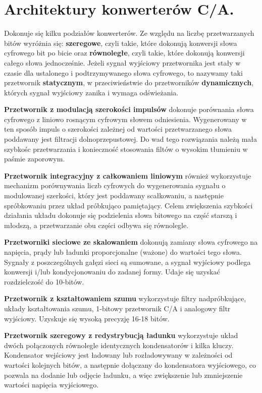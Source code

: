 \documentclass[10pt,a4paper]{report}
\begin{document}
	\section{Architektury konwerterów C/A. \cite{cmosanal} \cite{plassche}}
	{	Dokonuje się kilku podziałów konwerterów. Ze względu na liczbę przetwarzanych bitów wyróżnia się: \textbf{szeregowe}, czyli takie, które dokonują konwersji słowa cyfrowego bit po bicie oraz \textbf{równoległe}, czyli takie, które dokonują konwersji całego słowa jednocześnie. Jeżeli sygnał wyjściowy przetwornika jest stały w czasie dla ustalonego i podtrzymywanego słowa cyfrowego, to nazywamy taki przetwornik \textbf{statycznym}, w przeciwieństwie do przetworników \textbf{dynamicznych}, których sygnał wyjściowy zanika i wymaga odświeżania. }
	
	{	\textbf{Przetwornik z modulacją szerokości impulsów} dokonuje porównania słowa cyfrowego z liniowo rosnącym cyfrowym słowem odniesienia. Wygenerowany w ten sposób impuls o szerokości zależnej od wartości przetwarzanego słowa poddawany jest filtracji dolnoprzepustowej. Do wad tego rozwiązania należą mała szybkośc przetwarzania i konieczność stosowania filtów o wysokim tłumieniu w paśmie zaporowym. }
	
	{	\textbf{Przetwornik integracyjny z całkowaniem liniowym} również wykorzystuje mechanizm porównywania liczb cyfrowych do wygenerowania sygnału o modulowanej szerkości, który jest poddawany scałkowaniu, a następnie spróbkowaniu przez układ próbkująco pamiętający. Celem zwiększenia szybkości działania układu dokonuje się podzielenia słowa bitowego na część starszą i młodszą, a przetwarzanie obu części odbywa się równolegle. }
	
	{	\textbf{Przetworniki sieciowe ze skalowaniem} dokonują zamiany słowa cyfrowego na napięcia, prądy lub ładunki proporcjonalne (ważone) do wartości tego słowa. Sygnały z poszczególnych gałęzi sieci są sumowane, a sygnał wyjściowy podlega konwersji i/lub kondycjonowaniu do zadanej formy. Udaje się uzyskać rozdzielczość do 10-bitów.}
	
	{	\textbf{Przetwornik z kształtowaniem szumu} wykorzystuje filtry nadpróbkujące, układy kształtowania szumu, 1-bitowy przetwornik C/A i analogowy filtr wyjściowy. Uzyskuje się wysoką precyzję 16-18 bitów. }
	
	{	\textbf{Przetwornik szeregowy z redystrybucją ładunku} wykorzystuje układ dwóch połączonych równolegle identycznych kondensatorów i kilka kluczy. Kondensator wejściowy jest ładowany lub rozładowywany w zależności od wartości kolejnych bitów, a następnie dołączany do kondensatora wyjściowego, co pozwala na dodanie lub odjęcie ładunku, a więc zwiększenie lub zmniejszenie wartości napięcia wyjściowego.
	}
	
\end{document}
